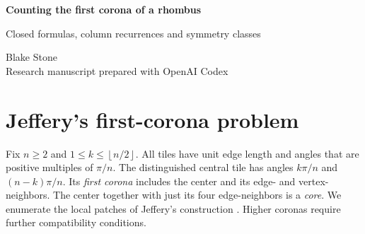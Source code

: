 \documentclass[11pt,letterpaper]{article}
\newcommand{\floor}[1]{\left\lfloor #1\right\rfloor}
\newcommand{\oid}[1]{\href{https://oeis.org/A#1}{A#1}}
\begin{document}
\thispagestyle{plain}
\begin{center}
{\LARGE\bfseries Counting the first corona of a rhombus\par}
\vspace{0.35em}
{\large Closed formulas, column recurrences and symmetry classes\par}
\vspace{0.7em}
Blake Stone\\
{\small Research manuscript prepared with OpenAI Codex}
\end{center}
\begin{abstract}
L. Edson Jeffery gave a finite construction for the first ring of rhombi around a fixed central tile. He asked whether any column of the resulting table satisfies a recurrence. We give a closed expression for every entry and show that each column has least constant-coefficient recurrence order 13. The expression proves his row congruence modulo $2^{n-3}$ and determines when the modulus is sharp in the first column. Up to isometry, the least eventual order is 20. For a $45^\circ$ central rhombus the symmetry count is 385, a correction to the value 414 in \oid{233333}. We also prove the proposed recurrences and generating functions for the four edge-neighbor tiles.
\end{abstract}

\section{Jeffery's first-corona problem}
Fix $n\ge2$ and $1\le k\le\floor{n/2}$. All tiles have unit edge length and angles that are positive multiples of $\pi/n$. The distinguished central tile has angles $k\pi/n$ and $(n-k)\pi/n$. Its \emph{first corona} includes the center and its edge- and vertex-neighbors. The center together with just its four edge-neighbors is a \emph{core}. We enumerate the local patches of Jeffery's construction \cite{jeffery}. Higher coronas require further compatibility conditions.
\end{document}
